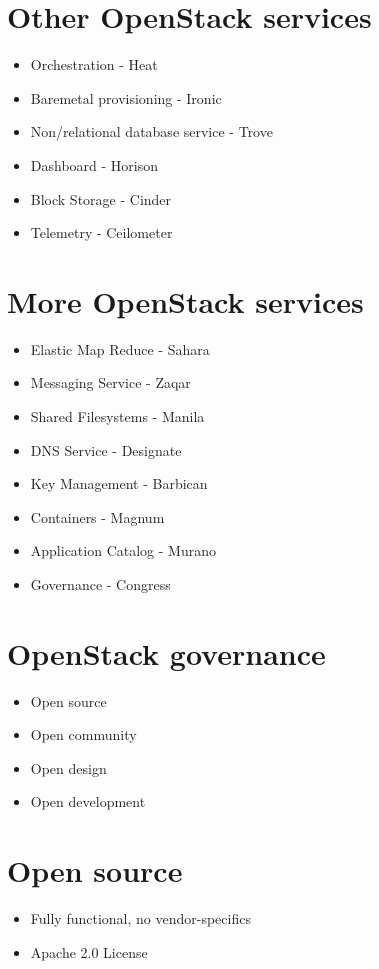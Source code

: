 \documentclass[11pt]{article}
\begin{document}
\section*{Other OpenStack services}
\label{sec:orgee820a1}
\begin{itemize}
\item Orchestration - Heat
\item Baremetal provisioning - Ironic
\item Non/relational database service - Trove
\item Dashboard - Horison
\item Block Storage - Cinder
\item Telemetry - Ceilometer
\end{itemize}

\section*{More OpenStack services}
\label{sec:orge3df3f5}
\begin{itemize}
\item Elastic Map Reduce - Sahara
\item Messaging Service - Zaqar
\item Shared Filesystems - Manila
\item DNS Service - Designate
\item Key Management - Barbican
\item Containers - Magnum
\item Application Catalog - Murano
\item Governance - Congress
\end{itemize}

\section*{OpenStack governance}
\label{sec:orgfaf4906}
\begin{itemize}
\item Open source
\item Open community
\item Open design
\item Open development
\end{itemize}

\section*{Open source}
\label{sec:orga1893ea}
\begin{itemize}
\item Fully functional, no vendor-specifics
\item Apache 2.0 License
\end{itemize}
\end{document}
